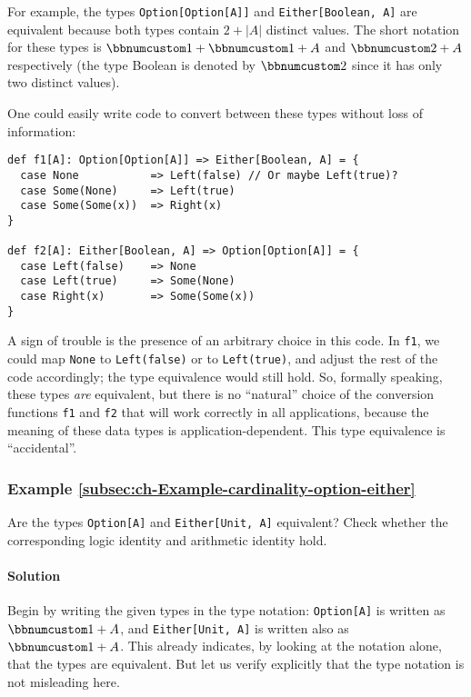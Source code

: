 For example, the types \lstinline!Option[Option[A]]! and \lstinline!Either[Boolean, A]!
are equivalent because both types contain $2+\left|A\right|$ distinct
values. The short notation for these types is $\bbnum 1+\bbnum 1+A$
and $\bbnum 2+A$ respectively (the type Boolean is denoted by $\bbnum 2$
since it has only two distinct values). 

One could easily write code to convert between these types without
loss of information:
\begin{lstlisting}
def f1[A]: Option[Option[A]] => Either[Boolean, A] = {
  case None           => Left(false) // Or maybe Left(true)?
  case Some(None)     => Left(true)
  case Some(Some(x))  => Right(x)
}

def f2[A]: Either[Boolean, A] => Option[Option[A]] = {
  case Left(false)    => None
  case Left(true)     => Some(None)
  case Right(x)       => Some(Some(x))
}
\end{lstlisting}
A sign of trouble is the presence of an arbitrary choice in this code.
In \lstinline!f1!, we could map \lstinline!None! to \lstinline!Left(false)!
or to \lstinline!Left(true)!, and adjust the rest of the code accordingly;
the type equivalence would still hold. So, formally speaking, these
types \emph{are} equivalent, but there is no ``natural'' choice
of the conversion functions \lstinline!f1! and \lstinline!f2! that
will work correctly in all applications, because the meaning of these
data types is application-dependent. This type equivalence is ``accidental''.

\subsubsection{Example \label{subsec:ch-Example-cardinality-option-either}\ref{subsec:ch-Example-cardinality-option-either}}

Are the types \lstinline!Option[A]! and \lstinline!Either[Unit, A]!
equivalent? Check whether the corresponding logic identity and arithmetic
identity hold.

\paragraph{Solution}

Begin by writing the given types in the type notation: \lstinline!Option[A]!
is written as $\bbnum 1+A$, and \lstinline!Either[Unit, A]! is written
also as $\bbnum 1+A$. This already indicates, by looking at the notation
alone, that the types are equivalent. But let us verify explicitly
that the type notation is not misleading here.

